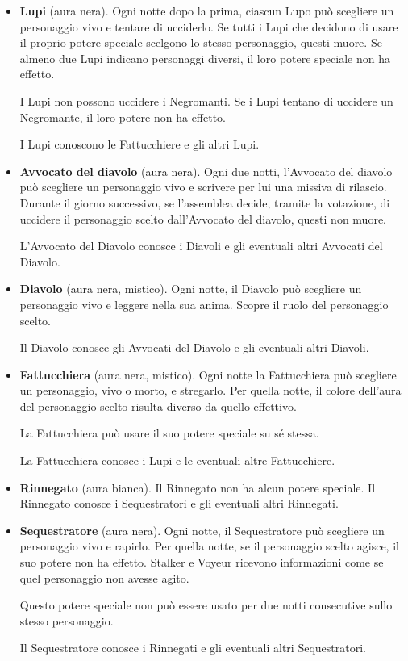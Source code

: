 \documentclass[a4paper,10pt]{article}
\begin{document}
\begin{itemize}
 \item {\bf Lupi} (aura nera). Ogni notte dopo la prima, ciascun Lupo può scegliere un
personaggio vivo e tentare di ucciderlo.
 Se tutti i Lupi che decidono di usare il proprio potere speciale scelgono lo
stesso personaggio, questi muore.
 Se almeno due Lupi indicano personaggi diversi, il loro potere speciale non ha
effetto.
 
 I Lupi non possono uccidere i Negromanti. Se i Lupi tentano di uccidere un
Negromante, il loro potere non ha effetto.
 
 I Lupi conoscono le Fattucchiere e gli altri Lupi.

 \item {\bf Avvocato del diavolo} (aura nera). Ogni due notti, l'Avvocato del
diavolo può scegliere un personaggio vivo e scrivere per lui una missiva di
rilascio.
 Durante il giorno successivo, se l'assemblea decide, tramite la votazione, di
uccidere il personaggio scelto dall'Avvocato del diavolo, questi non muore.
 
 L'Avvocato del Diavolo conosce i Diavoli e gli eventuali altri Avvocati del
Diavolo.

 \item {\bf Diavolo} (aura nera, mistico). Ogni notte, il Diavolo può scegliere
un personaggio vivo e leggere nella sua anima. Scopre il ruolo del personaggio
scelto.
 
 Il Diavolo conosce gli Avvocati del Diavolo e gli eventuali altri Diavoli.
 
 \item {\bf Fattucchiera} (aura nera, mistico). Ogni notte la Fattucchiera può scegliere
un personaggio, vivo o morto, e stregarlo. Per quella notte, il colore dell'aura
del personaggio scelto risulta diverso da quello effettivo.
 
 La Fattucchiera può usare il suo potere speciale su sé stessa.
 
 La Fattucchiera conosce i Lupi e le eventuali altre Fattucchiere.
  
 \item {\bf Rinnegato} (aura bianca). Il Rinnegato non ha alcun potere speciale.
Il Rinnegato conosce i Sequestratori e gli eventuali altri Rinnegati.

 \item {\bf Sequestratore} (aura nera). Ogni notte, il Sequestratore può
scegliere un personaggio vivo e rapirlo. Per quella notte, se il personaggio
scelto agisce, il suo potere non ha effetto.
 Stalker e Voyeur ricevono informazioni come se quel personaggio non avesse
agito.
 
 Questo potere speciale non può essere usato per due notti consecutive sullo
stesso personaggio.
 
 Il Sequestratore conosce i Rinnegati e gli eventuali altri Sequestratori.


\end{itemize}
\end{document}
